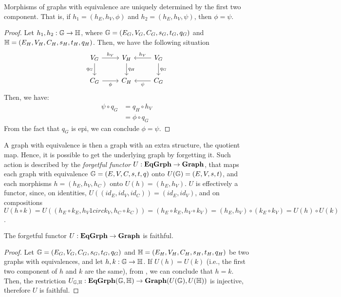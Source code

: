 \begin{obs}\label{obs:eq_grph_morph_det_by_first_two_comp}
    Morphisms of graphs with equivalence are uniquely determined by the first two component. That is, if $h_1 = (h_E, h_V, \phi)$ and $h_2 = (h_E, h_V, \psi)$, then $\phi = \psi$.
\end{obs}

\begin{proof}
    Let $h_1, h_2 : \mathbb{G \to H}$, where $\mathbb{G} = (E_G, V_G, C_G, s_G, t_G, q_G)$ and $\mathbb{H} = (E_H, V_H, C_H, s_H, t_H, q_H)$. Then, we have the following situation
    \[
        \begin{tikzcd}
            V_G \arrow[r, "{h_V}"] \arrow[d, "{q_G}"swap] & V_H \arrow[d, "{q_H}"] & V_G \arrow[l, "{h_V}"swap] \arrow[d, "{q_G}"] \\
            C_G \arrow[r, "{\phi}"swap] & C_H & \arrow[l, "{\psi}"] C_G
        \end{tikzcd}
     \]
     Then, we have:
     \begin{align*}
         \psi \circ q_G &= q_H \circ h_V \\
                        &= \phi \circ q_G
     \end{align*}
     From the fact that $q_G$ is epi, we can conclude $\phi = \psi$.
\end{proof}

A graph with equivalence is then a graph with an extra structure, the quotient map. Hence, it is possible to get the underlying graph by forgetting it. Such action is described by the \emph{forgetful functor} $U : \mathbf{EqGrph} \to \mathbf{Graph}$, that maps each graph with equivalence $\mathbb{G} =  (E, V, C, s, t, q)$ onto $U(\mathbb{G}) = (E, V, s, t)$, and each morphisms $h = (h_E, h_V, h_C)$ onto $U(h) = (h_E, h_V)$. $U$ is effectively a functor, since, on identities, $U((id_E, id_V, id_C)) = (id_E, id_V)$, and on compositions $U(h \circ k) = U((h_E \circ k_E, h_V 1circ k_V, h_C \circ k_C)) = (h_E \circ k_E, h_V \circ k_V) = (h_E, h_V) \circ (k_E \circ k_V) = U(h) \circ U(k)$.

\begin{prop}\label{prop:U_is_faithf}
    The forgetful functor $U: \mathbf{EqGrph} \to \mathbf{Graph}$ is faithful.
\end{prop}

\begin{proof}
    Let $\mathbb{G} = (E_G, V_G, C_G, s_G, t_G, q_G)$ and $\mathbb{H} = (E_H, V_H, C_H, s_H, t_H, q_H)$  be two graphs with equivalences, and let $h, k : \mathbb{G \to H}$.
    If $U(h) = U(k)$ (i.e., the first two component of $h$ and $k$ are the same), from , we can conclude that $h = k$. Then, the restriction $U_{\mathbb{G, H}} : \mathbf{EqGrph}(\mathbb{G, H}) \to \mathbf{Graph}(U(\mathbb{G}), U(\mathbb{H}))$ is injective, therefore $U$ is faithful.
\end{proof}

